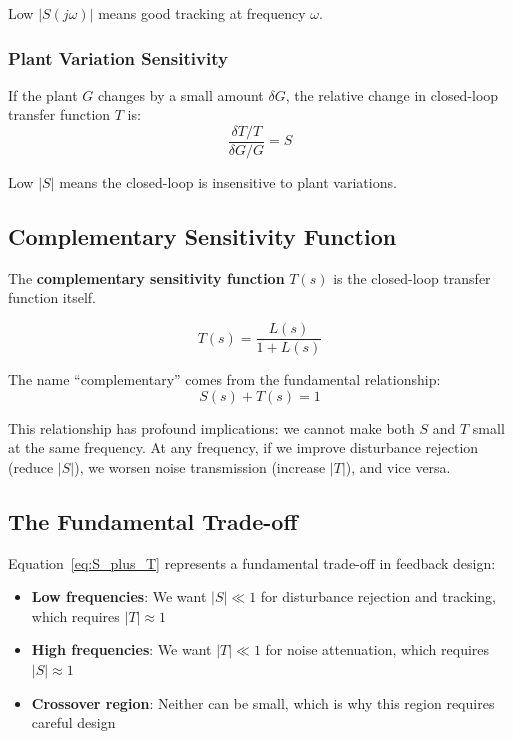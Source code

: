 Low $|S(j\omega)|$ means good tracking at frequency $\omega$.

\subsubsection{Plant Variation Sensitivity}

If the plant $G$ changes by a small amount $\delta G$, the relative change in closed-loop transfer function $T$ is:
\begin{equation}
    \frac{\delta T / T}{\delta G / G} = S
\end{equation}

Low $|S|$ means the closed-loop is insensitive to plant variations.

\subsection{Complementary Sensitivity Function}

The \textbf{complementary sensitivity function} $T(s)$ is the closed-loop transfer function itself.

\begin{definition}
\begin{equation}
    T(s) = \frac{L(s)}{1 + L(s)}
\end{equation}
\end{definition}

The name ``complementary'' comes from the fundamental relationship:
\begin{equation}
    \boxed{S(s) + T(s) = 1}
    \label{eq:S_plus_T}
\end{equation}

This relationship has profound implications: we cannot make both $S$ and $T$ small at the same frequency. At any frequency, if we improve disturbance rejection (reduce $|S|$), we worsen noise transmission (increase $|T|$), and vice versa.

\subsection{The Fundamental Trade-off}

Equation~\eqref{eq:S_plus_T} represents a fundamental trade-off in feedback design:

\begin{itemize}
    \item \textbf{Low frequencies}: We want $|S| \ll 1$ for disturbance rejection and tracking, which requires $|T| \approx 1$
    \item \textbf{High frequencies}: We want $|T| \ll 1$ for noise attenuation, which requires $|S| \approx 1$
    \item \textbf{Crossover region}: Neither can be small, which is why this region requires careful design
\end{itemize}

